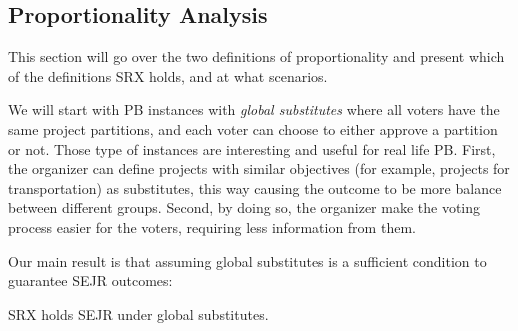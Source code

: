 \documentclass[runningheads]{llncs}
\newcommand{\kibitz}[2]{\ifnum\Comments=1{\color{#1}{#2}}\fi}
\newcommand{\rf}[1]{\kibitz{blue}{[Roy says:#1]}}
\begin{document}



\subsection{Proportionality Analysis}\label{sec:prop_an}

This section will go over the two definitions of proportionality and present which of the definitions SRX holds, and at what scenarios.

We will start with PB instances with \emph{global substitutes} \cite{jain2021partition} where all voters have the same project partitions, and each voter can choose to either approve a partition or not. Those type of instances are interesting and useful for real life PB. First, the organizer can define projects with similar objectives (for example, projects for transportation) as substitutes, this way causing the outcome to be more balance between different groups. Second, by doing so, the organizer make the voting process easier for the voters, requiring less information from them.

Our main result is that assuming global substitutes is a sufficient condition to guarantee SEJR outcomes:
\begin{theorem}\label{theorem:ejr}
SRX holds SEJR under global substitutes.
\end{theorem}
\end{document}
